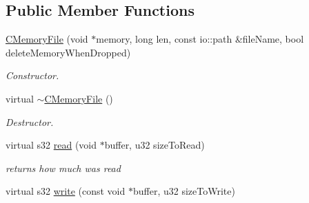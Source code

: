 \subsection*{Public Member Functions}
\begin{DoxyCompactItemize}
\item 
\hypertarget{classirr_1_1io_1_1_c_memory_file_abe6b794cc58e6d8d4b30601287fa5e99}{\hyperlink{classirr_1_1io_1_1_c_memory_file_abe6b794cc58e6d8d4b30601287fa5e99}{C\-Memory\-File} (void $\ast$memory, long len, const io\-::path \&file\-Name, bool delete\-Memory\-When\-Dropped)}\label{classirr_1_1io_1_1_c_memory_file_abe6b794cc58e6d8d4b30601287fa5e99}

\begin{DoxyCompactList}\small\item\em Constructor. \end{DoxyCompactList}\item 
\hypertarget{classirr_1_1io_1_1_c_memory_file_a44c6360f26520205f2266777fe0562c9}{virtual \hyperlink{classirr_1_1io_1_1_c_memory_file_a44c6360f26520205f2266777fe0562c9}{$\sim$\-C\-Memory\-File} ()}\label{classirr_1_1io_1_1_c_memory_file_a44c6360f26520205f2266777fe0562c9}

\begin{DoxyCompactList}\small\item\em Destructor. \end{DoxyCompactList}\item 
\hypertarget{classirr_1_1io_1_1_c_memory_file_a9a8d7778983e8b98516ce0ede79afc07}{virtual s32 \hyperlink{classirr_1_1io_1_1_c_memory_file_a9a8d7778983e8b98516ce0ede79afc07}{read} (void $\ast$buffer, u32 size\-To\-Read)}\label{classirr_1_1io_1_1_c_memory_file_a9a8d7778983e8b98516ce0ede79afc07}

\begin{DoxyCompactList}\small\item\em returns how much was read \end{DoxyCompactList}\item 
\hypertarget{classirr_1_1io_1_1_c_memory_file_a9a47376b6659816778d255bccc341158}{virtual s32 \hyperlink{classirr_1_1io_1_1_c_memory_file_a9a47376b6659816778d255bccc341158}{write} (const void $\ast$buffer, u32 size\-To\-Write)}\label{classirr_1_1io_1_1_c_memory_file_a9a47376b6659816778d255bccc341158}


\end{DoxyCompactItemize}
